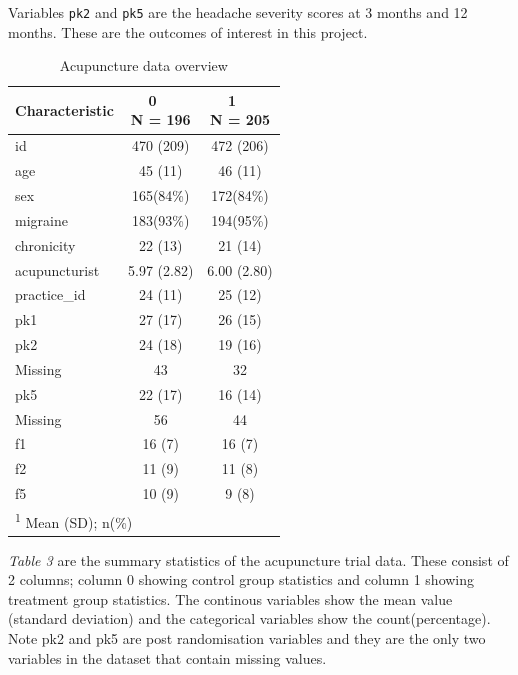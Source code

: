 \documentclass{article}
\begin{document}
Variables \texttt{pk2} and \texttt{pk5} are the headache severity scores
at 3 months and 12 months. These are the outcomes of interest in this
project.

\begin{table}[!h]
\centering
\caption{Acupuncture data overview}
\centering
\begin{tabular}[t]{l|c|c}
\hline
\textbf{Characteristic} & \makecell[c]{\textbf{0}\ \ \\N = 196} & \makecell[c]{\textbf{1}\ \ \\N = 205}\\
\hline
id & 470 (209) & 472 (206)\\
\hline
age & 45 (11) & 46 (11)\\
\hline
sex & 165(84\%) & 172(84\%)\\
\hline
migraine & 183(93\%) & 194(95\%)\\
\hline
chronicity & 22 (13) & 21 (14)\\
\hline
acupuncturist & 5.97 (2.82) & 6.00 (2.80)\\
\hline
practice\_id & 24 (11) & 25 (12)\\
\hline
pk1 & 27 (17) & 26 (15)\\
\hline
pk2 & 24 (18) & 19 (16)\\
\hline
\hspace{1em}Missing & 43 & 32\\
\hline
pk5 & 22 (17) & 16 (14)\\
\hline
\hspace{1em}Missing & 56 & 44\\
\hline
f1 & 16 (7) & 16 (7)\\
\hline
f2 & 11 (9) & 11 (8)\\
\hline
f5 & 10 (9) & 9 (8)\\
\hline
\multicolumn{3}{l}{\rule{0pt}{1em}\textsuperscript{1} Mean (SD); n(\%)}\\
\end{tabular}
\end{table}

\emph{Table 3} are the summary statistics of the acupuncture trial data.
These consist of 2 columns; column 0 showing control group statistics
and column 1 showing treatment group statistics. The continous variables
show the mean value (standard deviation) and the categorical variables
show the count(percentage). Note pk2 and pk5 are post randomisation
variables and they are the only two variables in the dataset that
contain missing values.

\newpage
\end{document}

